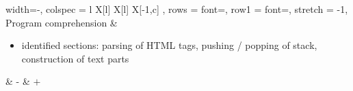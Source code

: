 {\begin{tblr}{
	width=\linewidth-\parindent,
	colspec = {
		l
		X[l]
		X[l]
		X[-1,c]
	},
	rows = {font=\footnotesize},
	row{1} = {font=\footnotesize\bfseries},
	stretch = -1,
}
	Program comprehension	&
	\begin{itemize}
		\item identified sections: parsing of HTML tags, pushing / popping of stack, construction of text parts
	\end{itemize}
		&
	 {-}	&
	$+$	\\

	\bottomrule
\end{tblr}

}

